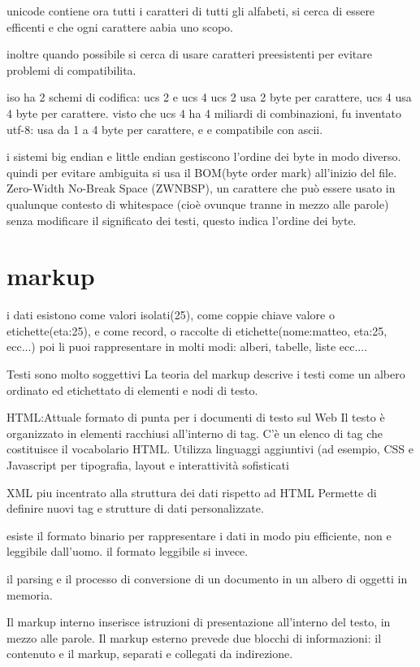 \documentclass[12pt]{article}
\begin{document}
unicode contiene ora tutti i caratteri di tutti gli alfabeti, si cerca di essere efficenti e che ogni carattere aabia uno scopo.

inoltre quando possibile si cerca di usare caratteri preesistenti per evitare problemi di compatibilita.

iso ha 2 schemi di codifica: ucs 2  e ucs 4
ucs 2 usa 2 byte per carattere, ucs 4 usa 4 byte per carattere.
visto che ucs 4 ha 4 miliardi di combinazioni, fu inventato utf-8: usa da 1 a 4 byte per carattere, e e compatibile con ascii.

i sistemi big endian e little endian gestiscono l'ordine dei byte in modo diverso.
quindi per evitare ambiguita si usa il BOM(byte order mark) all'inizio del file.
Zero-Width No-Break Space (ZWNBSP), un carattere che
può essere usato in qualunque contesto di whitespace (cioè ovunque
tranne in mezzo alle parole) senza modificare il significato dei testi, questo indica l'ordine dei byte.


\section{markup}

i dati esistono come valori isolati(25), come coppie chiave valore o etichette(eta:25), e come record, o raccolte di etichette(nome:matteo, eta:25, ecc...)
 poi li puoi rappresentare in molti modi: alberi, tabelle, liste ecc....

Testi sono molto soggettivi
La teoria del markup descrive i testi come un albero ordinato ed
etichettato di elementi e nodi di testo.

HTML:Attuale formato di punta per i documenti di testo sul Web
Il testo è organizzato in elementi racchiusi all'interno di tag. C'è un elenco di
tag che costituisce il vocabolario HTML.
Utilizza linguaggi aggiuntivi (ad esempio, CSS e Javascript per tipografia,
layout e interattività sofisticati

XML piu incentrato alla struttura dei dati rispetto ad HTML
Permette di definire nuovi tag e strutture di dati personalizzate.

esiste il formato binario per rappresentare i dati in modo piu efficiente, non e leggibile dall'uomo.
il formato leggibile si invece.

il parsing e il processo di conversione di un documento in un albero di oggetti in memoria.

Il markup interno inserisce istruzioni di presentazione all'interno
del testo, in mezzo alle parole.
Il markup esterno prevede due blocchi di informazioni: il
contenuto e il markup, separati e collegati da indirezione.
\end{document}
